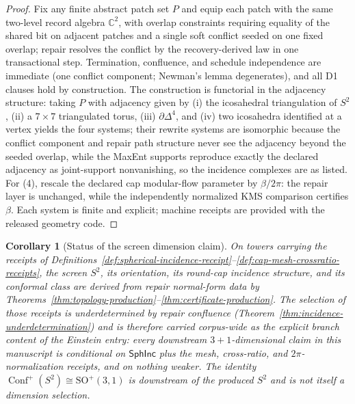 \documentclass[11pt]{article}
\newtheorem{corollary}[theorem]{Corollary}
\begin{document}
\begin{proof}
Fix any finite abstract patch set \(P\) and equip each patch with the same
two-level record algebra \(\mathbb C^2\), with overlap constraints requiring
equality of the shared bit on adjacent patches and a single soft conflict
seeded on one fixed overlap; repair resolves the conflict by the
recovery-derived law in one transactional step. Termination, confluence, and
schedule independence are immediate (one conflict component; Newman's lemma
degenerates), and all D1 clauses hold by construction. The construction is
functorial in the adjacency structure: taking \(P\) with adjacency given by
(i) the icosahedral triangulation of \(S^2\), (ii) a \(7\times7\) triangulated
torus, (iii) \(\partial\Delta^4\), and (iv) two icosahedra identified at a
vertex yields the four systems; their rewrite systems are isomorphic because
the conflict component and repair path structure never see the adjacency
beyond the seeded overlap, while the MaxEnt supports reproduce exactly the
declared adjacency as joint-support nonvanishing, so the incidence complexes
are as listed. For (4), rescale the declared cap modular-flow parameter by
\(\beta/2\pi\): the repair layer is unchanged, while the independently
normalized KMS comparison certifies \(\beta\). Each system is finite and
explicit; machine receipts are provided with the released geometry code.
\end{proof}

\begin{corollary}[Status of the screen dimension claim]
\label{cor:dimension-selection-status}
On towers carrying the receipts of
Definitions~\ref{def:spherical-incidence-receipt}--\ref{def:cap-mesh-crossratio-receipts},
the screen \(S^2\), its orientation, its round-cap incidence structure, and
its conformal class are \emph{derived} from repair normal-form data by
Theorems~\ref{thm:topology-production}--\ref{thm:certificate-production}. The
selection of those receipts is \emph{underdetermined} by repair confluence
(Theorem~\ref{thm:incidence-underdetermination}) and is therefore carried
corpus-wide as the explicit branch content of the Einstein entry: every
downstream \(3+1\)-dimensional claim in this manuscript is conditional on
\(\mathsf{SphInc}\) plus the mesh, cross-ratio, and \(2\pi\)-normalization
receipts, and on nothing weaker. The identity
\(\operatorname{Conf}^+(S^2)\cong\mathrm{SO}^+(3,1)\) is downstream of the
produced \(S^2\) and is not itself a dimension selection.
\end{corollary}
\end{document}

